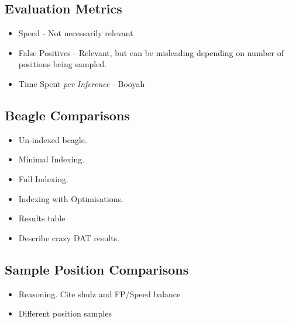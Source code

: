 \documentclass[10pt]{beamer}
\begin{document}
\begin{NoHyper}
\subsection{Evaluation Metrics}
\begin{frame}
  \begin{itemize}
  \frametitle{Metrics for Analysing Indexing Performance}
  \item<1-> Speed - Not necessarily relevant
  \item<2-> False Positives - Relevant, but can be misleading depending on
  number of positions being sampled.
  \item<3-> Time Spent \emph{per Inference} - Booyah
  \end{itemize}
\end{frame}


\subsection{Beagle Comparisons}
\begin{frame}
  \begin{itemize}
  \frametitle{Comparing Varieties of Beagle}
  \item<1-> Un-indexed beagle.
  \item<2-> Minimal Indexing.
  \item<3-> Full Indexing.
  \item<4-> Indexing with Optimisations.
  \end{itemize}
\end{frame}

\begin{frame}
  \begin{itemize}
  \frametitle{Comparing Varieties of Beagle}
  \item<1-> Results table
  \end{itemize}
\end{frame}

\begin{frame}
  \begin{itemize}
  \frametitle{Most Extreme Example Problems}
  \item<1-> Describe crazy DAT results.
  \end{itemize}
\end{frame}

\subsection{Sample Position Comparisons}
\begin{frame}
  \begin{itemize}
  \frametitle{Fingerprint Sampling Varieties}
  \item<1-> Reasoning. Cite shulz and FP/Speed balance
  \item<2-> Different position samples
  \end{itemize}
\end{frame}


\end{NoHyper}
\end{document}
